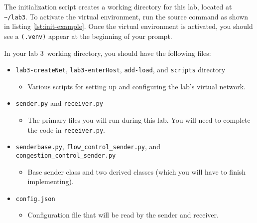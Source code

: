 \documentclass[11pt]{article}
\def\thelab{3}
\begin{document}
The initialization script creates a working directory for this lab, located at \texttt{\textasciitilde/lab\thelab}. To activate the virtual environment, run the source command as shown in listing \ref{lst:init-example}. Once the virtual environment is activated, you should see a \texttt{(.venv)} appear at the beginning of your prompt.



In your lab \thelab~working directory, you should have the following files:
\begin{itemize}
    \item \texttt{lab3-createNet}, \texttt{lab3-enterHost}, \texttt{add-load}, and \texttt{scripts} directory
        \begin{itemize}
            \item Various scripts for setting up and configuring the lab's virtual network.
        \end{itemize}

    \item \texttt{sender.py} and \texttt{receiver.py}
        \begin{itemize}
            \item The primary files you will run during this lab. You will need to complete the code in \texttt{receiver.py}.
        \end{itemize}

    \item \texttt{senderbase.py}, \texttt{flow\_control\_sender.py}, and \texttt{congestion\_control\_sender.py}
        \begin{itemize}
            \item Base sender class and two derived classes (which you will have to finish implementing).
        \end{itemize}

    \item \texttt{config.json}
        \begin{itemize}
            \item Configuration file that will be read by the sender and receiver.
        \end{itemize}


\end{itemize}
\end{document}
